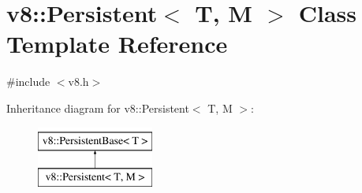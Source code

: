 \hypertarget{classv8_1_1Persistent}{}\section{v8\+:\+:Persistent$<$ T, M $>$ Class Template Reference}
\label{classv8_1_1Persistent}


{\ttfamily \#include $<$v8.\+h$>$}

Inheritance diagram for v8\+:\+:Persistent$<$ T, M $>$\+:\begin{figure}[H]
\begin{center}
\leavevmode
\includegraphics[height=2.000000cm]{classv8_1_1Persistent}
\end{center}
\end{figure}
